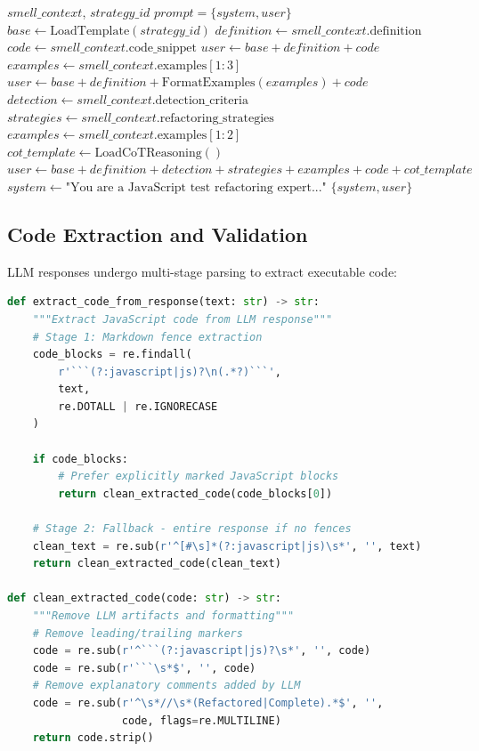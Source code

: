 \begin{algorithm}
\caption{Prompt Construction}
\label{alg:prompt-construction}
\begin{algorithmic}[1]
\Require $smell\_context$, $strategy\_id$
\Ensure $prompt = \{system, user\}$
\State $base \gets \text{LoadTemplate}(strategy\_id)$
\State $definition \gets smell\_context.\text{definition}$
\State $code \gets smell\_context.\text{code\_snippet}$
    \State $user \gets base + definition + code$
    \State $examples \gets smell\_context.\text{examples}[1:3]$
    \State $user \gets base + definition + \text{FormatExamples}(examples) + code$
    \State $detection \gets smell\_context.\text{detection\_criteria}$
    \State $strategies \gets smell\_context.\text{refactoring\_strategies}$
    \State $examples \gets smell\_context.\text{examples}[1:2]$
    \State $cot\_template \gets \text{LoadCoTReasoning}()$
    \State $user \gets base + definition + detection + strategies + examples + code + cot\_template$
\EndIf
\State $system \gets \text{"You are a JavaScript test refactoring expert..."}$
\State \Return $\{system, user\}$
\end{algorithmic}
\end{algorithm}

\subsection{Code Extraction and Validation}

LLM responses undergo multi-stage parsing to extract executable code:

\begin{lstlisting}[language=Python, caption=Code Extraction Pipeline]
def extract_code_from_response(text: str) -> str:
    """Extract JavaScript code from LLM response"""
    # Stage 1: Markdown fence extraction
    code_blocks = re.findall(
        r'```(?:javascript|js)?\n(.*?)```', 
        text, 
        re.DOTALL | re.IGNORECASE
    )
    
    if code_blocks:
        # Prefer explicitly marked JavaScript blocks
        return clean_extracted_code(code_blocks[0])
    
    # Stage 2: Fallback - entire response if no fences
    clean_text = re.sub(r'^[#\s]*(?:javascript|js)\s*', '', text)
    return clean_extracted_code(clean_text)

def clean_extracted_code(code: str) -> str:
    """Remove LLM artifacts and formatting"""
    # Remove leading/trailing markers
    code = re.sub(r'^```(?:javascript|js)?\s*', '', code)
    code = re.sub(r'```\s*$', '', code)
    # Remove explanatory comments added by LLM
    code = re.sub(r'^\s*//\s*(Refactored|Complete).*$', '', 
                  code, flags=re.MULTILINE)
    return code.strip()
\end{lstlisting}

